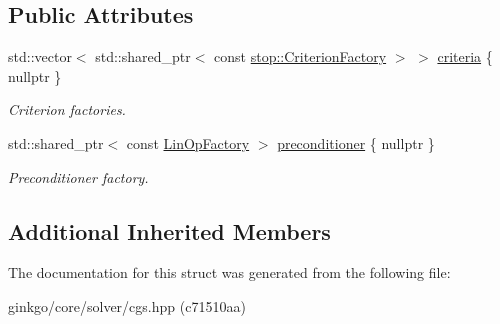 \subsection*{Public Attributes}
\begin{DoxyCompactItemize}
\item 
\mbox{\label{structgko_1_1solver_1_1Cgs_1_1parameters__type_a02051dffae27205cd269beeaa29f8163}} 
std\+::vector$<$ std\+::shared\+\_\+ptr$<$ const \hyperlink{namespacegko_1_1stop_ab12a51109c50b35ec36dc5a393d6a9a0}{stop\+::\+Criterion\+Factory} $>$ $>$ \hyperlink{structgko_1_1solver_1_1Cgs_1_1parameters__type_a02051dffae27205cd269beeaa29f8163}{criteria} \{ nullptr \}
\begin{DoxyCompactList}\small\item\em Criterion factories. \end{DoxyCompactList}\item 
\mbox{\label{structgko_1_1solver_1_1Cgs_1_1parameters__type_abbe93702c7bcb93bc1d831d6b947a0f9}} 
std\+::shared\+\_\+ptr$<$ const \hyperlink{classgko_1_1LinOpFactory}{Lin\+Op\+Factory} $>$ \hyperlink{structgko_1_1solver_1_1Cgs_1_1parameters__type_abbe93702c7bcb93bc1d831d6b947a0f9}{preconditioner} \{ nullptr \}
\begin{DoxyCompactList}\small\item\em Preconditioner factory. \end{DoxyCompactList}\end{DoxyCompactItemize}
\subsection*{Additional Inherited Members}


The documentation for this struct was generated from the following file\+:\begin{DoxyCompactItemize}
\item 
ginkgo/core/solver/cgs.\+hpp (c71510aa)\end{DoxyCompactItemize}
